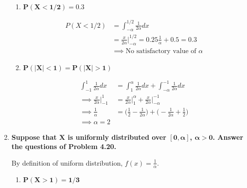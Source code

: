 \documentclass[10pt, oneside]{article}   	%
\theoremstyle{definition}
\begin{document}
\begin{enumerate}[label=4.\arabic*]
\begin{enumerate}
	\item  \begin{tcolorbox}[
	  colback=Cerulean!5!white,
	  colframe=Cerulean!75!black]
	\textbf{$\bm{P(X < 1/2) = 0.3}$}
	\end{tcolorbox}
	
	\begin{align*}
	P(X < 1/2) &= \int^{1/2}_{-\alpha} \frac{1}{2\alpha} dx \\
	&= \frac{x}{2\alpha} \Big|^{1/2}_{-\alpha} = 0.25 \frac{1}{\alpha} + 0.5 = 0.3 \\
	&\implies \boxed{\text{No satisfactory value of }\alpha}
	\end{align*}
	
	\item  \begin{tcolorbox}[
	  colback=Cerulean!5!white,
	  colframe=Cerulean!75!black]
	\textbf{$\bm{P(|X| < 1) = P(|X| > 1)}$}
	\end{tcolorbox}
	
	\begin{align*}
	\int^1_{-1} \frac{1}{2\alpha} dx &= \int^\alpha_1 \frac{1}{2\alpha} dx + \int^{-1}_{-\alpha} \frac{1}{2\alpha} dx \\
	\implies \frac{x}{2\alpha} \Big|^1_{-1} &= \frac{x}{2\alpha} \Big|^\alpha_1 + \frac{x}{2\alpha} \Big|^{-1}_{-\alpha} \\
	\implies \frac{1}{\alpha} &= \Bigg( \frac{1}{2} - \frac{1}{2\alpha} \Bigg) + \Bigg( -\frac{1}{2\alpha} + \frac{1}{2} \Bigg) \\
	\implies \boxed{\alpha = 2}
	\end{align*}
	
	\end{enumerate}
	
\item  \begin{tcolorbox}[
  colback=Cerulean!5!white,
  colframe=Cerulean!75!black]
\textbf{Suppose that $\bm{X}$ is uniformly distributed over $\bm{[0, \alpha]}$, $\bm{\alpha > 0}$. Answer the questions of Problem 4.20.}
\end{tcolorbox}

	By definition of uniform distribution, $f(x) = \frac{1}{\alpha}$.

	\begin{enumerate}
	\item  \begin{tcolorbox}[
	  colback=Cerulean!5!white,
	  colframe=Cerulean!75!black]
	\textbf{$\bm{P(X > 1) = 1/3}$}
	\end{tcolorbox}
	

\end{enumerate}
\end{enumerate}
\end{document}
